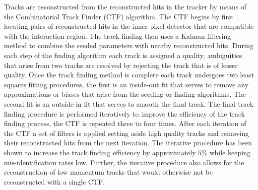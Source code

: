Tracks are reconstructed from the reconstructed hits in the tracker by means of the Combinatorial Track Finder (CTF) algorithm\cite{TRACKRECO}.
The CTF begins by first locating pairs of reconstructed hits in the inner pixel detector that are compatible with the interaction region.
The track finding then uses a Kalman filtering method to combine the seeded parameters with nearby reconstructed hits.
During each step of the finding algorithm each track is assigned a quality, ambiguities that arise from two tracks are resolved by rejecting the track that is of lesser quality.
Once the track finding method is complete each track undergoes two least squares fitting procedures, the first is an inside-out fit that serves to remove any approximations or biases that arise from the seeding or finding algorithms.
The second fit is an outside-in fit that serves to smooth the final track.
The final track finding procedure is performed iteratively to improve the efficiency of the track finding process, the CTF is repeated three to four times.
After each iteration of the CTF a set of filters is applied setting aside high quality tracks and removing their reconstructed hits from the next iteration.
The iterative procedure has been shown to increase the track finding efficiency by approximately $5\%$ while keeping mis-identification rates low.
Further, the iterative procedure also allows for the reconstruction of low momentum tracks that would otherwise not be reconstructed with a single CTF.
